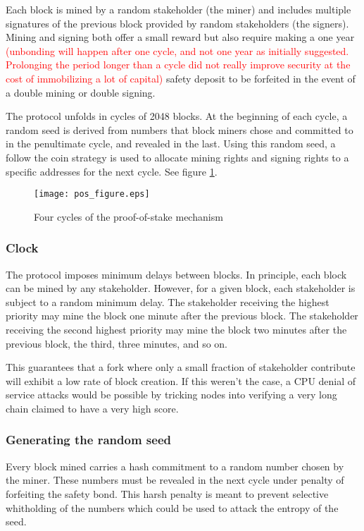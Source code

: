 \documentclass[letterpaper]{article}
\newcommand\change[1]{\textcolor{red}{#1}}
\begin{document}
Each block is mined by a random stakeholder (the miner) and includes
multiple signatures of the previous block provided by random 
stakeholders (the signers). Mining and signing both offer a small reward but
also require making a one year \change{(unbonding will happen after one cycle, and not one year as initially suggested. Prolonging the period longer than a cycle did not really improve security at the cost of immobilizing a lot of capital)} safety deposit to be
forfeited in the event of a double mining or double signing.

The protocol unfolds in cycles of \num{2048} blocks. At the beginning of each
cycle, a random seed is derived from numbers that block miners chose and committed
to in the penultimate cycle, and revealed in the last. Using this random seed,
a follow the coin strategy is used to allocate mining rights and signing rights
to a specific addresses for the next cycle. See figure \ref{fig:pos_figure}.

\begin{figure}[b!]
  \centering
  \texttt{[image: pos\_figure.eps]}
  \caption{Four cycles of the proof-of-stake mechanism}
  \label{fig:pos_figure}
\end{figure}


\subsubsection{Clock}

The protocol imposes minimum delays between blocks. In principle, each block
can be mined by any stakeholder. However, for a given block, each stakeholder
is subject to a random minimum delay. The stakeholder receiving the highest
priority may mine the block one minute after the previous block. The
stakeholder receiving the second highest priority may mine the block two
minutes after the previous block, the third, three minutes, and so on.

This guarantees that a fork where only a small fraction of stakeholder
contribute will exhibit a low rate of block creation. If this weren't 
the case, a CPU denial of service attacks would be possible by
tricking nodes into verifying a very long chain claimed to have a very high
score.

\subsubsection{Generating the random seed}

Every block mined carries a hash commitment to a random number chosen by the
miner. These numbers must be revealed in the next cycle under penalty of
forfeiting the safety bond. This harsh penalty is meant to prevent selective
whitholding of the numbers which could be used to attack the entropy of the seed. 
\end{document}
